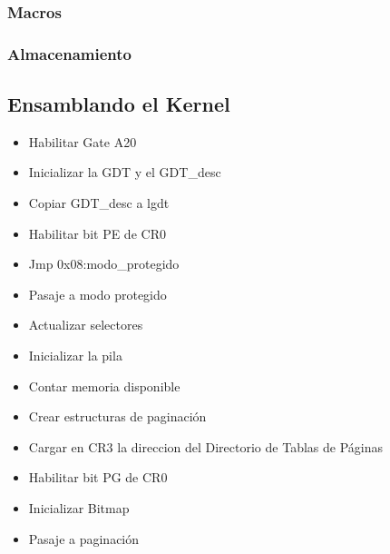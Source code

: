 \documentclass[11pt, a4paper]{article}
\begin{document}
		\subsubsection{Macros}
		\subsubsection{Almacenamiento}
	\subsection{Ensamblando el Kernel}
	\label{kernel}	
		\begin{itemize}
			\item Habilitar Gate A20
			\item Inicializar la GDT y el GDT\_desc
			\item Copiar GDT\_desc a lgdt
			\item Habilitar bit PE de CR0
			\item Jmp 0x08:modo\_protegido
			\item Pasaje a modo protegido
			\item Actualizar selectores
			\item Inicializar la pila
			\item Contar memoria disponible
			\item Crear estructuras de paginación
			\item Cargar en CR3 la direccion del Directorio de Tablas de Páginas
			\item Habilitar bit PG de CR0
			\item Inicializar Bitmap
			\item Pasaje a paginación
		\end{itemize}
	
\end{document}
